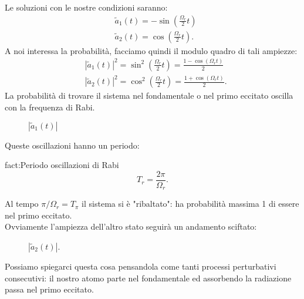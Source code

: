 Le soluzioni con le nostre condizioni saranno:
\[\begin{aligned}
    &\tilde{a}_1(t) = -\sin\left(\frac{\Omega_r}{2}t\right)\\
    &\tilde{a}_2(t) = \cos\left(\frac{\Omega_r}{2}t\right)
.\end{aligned}\]
A noi interessa la probabilità, facciamo quindi il modulo quadro di tali ampiezze:
\[\begin{aligned}
    &\left|\tilde{a}_1(t)\right|^2 = \sin^2\left(\frac{\Omega_r}{2}t\right)=
    \frac{1-\cos\left(\Omega_r t\right)}{2}\\
    &\left|\tilde{a}_2(t)\right|^2 = \cos^2\left(\frac{\Omega_r}{2}t\right)=
    \frac{1+\cos\left(\Omega_rt\right)}{2}
.\end{aligned}\]
La probabilità di trovare il sistema nel fondamentale o nel primo eccitato oscilla con la frequenza di Rabi. 
\begin{figure}[H]
    \centering
    \caption{$\left|\tilde{a}_1(t) \right|$ }
    \label{ddd}
\end{figure}
Queste oscillazioni hanno un periodo:
\begin{fact}{fact:Periodo oscillazioni di Rabi}
\[
    T_r = \frac{2\pi}{\Omega_r}
.\] 
\end{fact}
Al tempo $\pi /\Omega_r = T_\pi$ il sistema si è "ribaltato": ha probabilità massima 1 di essere nel primo eccitato.\\
Ovviamente l'ampiezza dell'altro stato seguirà un andamento sciftato:
\begin{figure}[H]
    \centering
    \caption{$\left|\tilde{a}_2(t) \right|$.}
    \label{1111}
\end{figure}
\noindent
Possiamo spiegarci questa cosa pensandola come tanti processi perturbativi consecutivi: il nostro atomo parte nel fondamentale ed assorbendo la radiazione passa nel primo eccitato. \\
